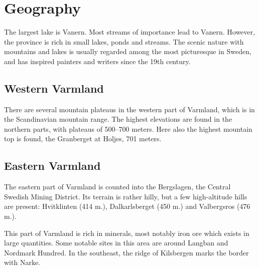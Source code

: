 \documentclass[a4paper, 11pt]{article}
\begin{document}
\section{Geography}
The largest lake is Vanern. Most streams of importance lead to Vanern. However, the province is rich in small lakes, ponds and streams. The scenic nature with mountains and lakes is usually regarded among the most picturesque in Sweden, and has inspired painters and writers since the 19th century.

\subsection{Western Varmland}
There are several mountain plateaus in the western part of Varmland, which is in the Scandinavian mountain range. The highest elevations are found in the northern parts, with plateaus of 500–700 meters. Here also the highest mountain top is found, the Granberget at Holjes, 701 meters.

\subsection{Eastern Varmland}
The eastern part of Varmland is counted into the Bergslagen, the Central Swedish Mining District. Its terrain is rather hilly, but a few high-altitude hills are present: Hvitklinten (414 m.), Dalkarlsberget (450 m.) and Valbergsros (476 m.).

This part of Varmland is rich in minerals, most notably iron ore which exists in large quantities. Some notable sites in this area are around Langban and Nordmark Hundred. In the southeast, the ridge of Kilsbergen marks the border with Narke.

\end{document}
